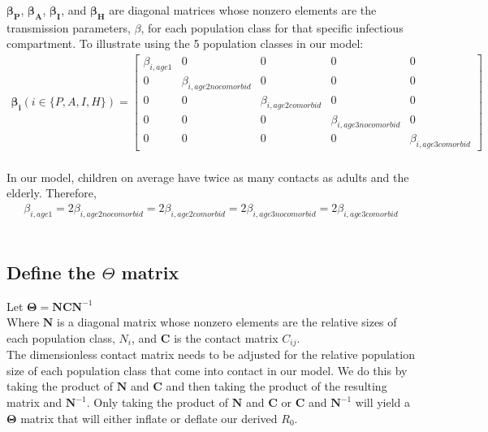 \documentclass{article}
\begin{document}
$\boldsymbol{\beta_P}$, $\boldsymbol{\beta_A}$, $\boldsymbol{\beta_I}$, and $\boldsymbol{\beta_H}$ are diagonal matrices whose nonzero elements are the transmission parameters, $\beta$, for each population class for that specific infectious compartment. To illustrate using the 5 population classes in our model:
\\
\begin{gather}
   \boldsymbol{\beta_i} (i \in \{P,A,I,H\}) = 
   \begin{bmatrix}
   \beta_{i,age1} & 0 & 0 & 0 & 0 \\
   0 & \beta_{i,age2nocomorbid} & 0 & 0 & 0 \\
   0 & 0 & \beta_{i,age2comorbid} & 0 & 0 \\
   0 & 0 & 0 & \beta_{i,age3nocomorbid} & 0 \\
   0 & 0 & 0 & 0 & \beta_{i,age3comorbid}
   \end{bmatrix}
\end{gather}
\\

In our model, children on average have twice as many contacts as adults and the elderly. Therefore, 
\\
\begin{gather*}
   \beta_{i,age1} = 2\beta_{i,age2nocomorbid} =  2\beta_{i,age2comorbid} = 2\beta_{i,age3nocomorbid} = 2\beta_{i,age3comorbid}
\end{gather*}\\
\newpage

\subsection*{Define the $\Theta$ matrix}

Let $\boldsymbol{\Theta} = \boldsymbol{N} \boldsymbol{C} \boldsymbol{N}^{-1}$\\

Where $\boldsymbol{N}$ is a diagonal matrix whose nonzero elements are the relative sizes of each population class, $N_i$, and $\boldsymbol{C}$ is the contact matrix $C_{ij}$. \\

The dimensionless contact matrix needs to be adjusted for the relative population size of each population class that come into contact in our model. We do this by taking the product of $\boldsymbol{N}$ and $\boldsymbol{C}$ and then taking the product of the resulting matrix and $\boldsymbol{N}^{-1}$. Only taking the product of $\boldsymbol{N}$ and $\boldsymbol{C}$ or $\boldsymbol{C}$ and $\boldsymbol{N}^{-1}$ will yield a $\boldsymbol{\Theta}$ matrix that will either inflate or deflate our derived $R_0$.\\
\end{document}

